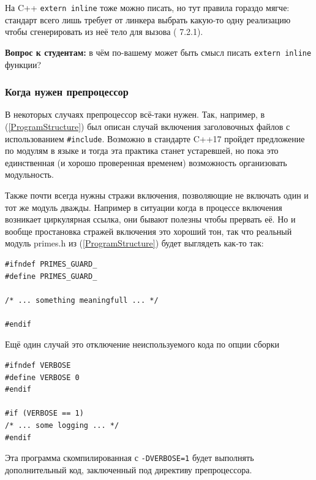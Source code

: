 \documentclass[a4paper,12pt,oneside]{article}
\newif\ifanswers
\begin{document}
На C++ \lstinline!extern inline! тоже можно писать, но тут правила гораздо мягче: стандарт всего лишь требует от линкера выбрать какую-то одну реализацию чтобы сгенерировать из неё тело для вызова (\cite{stdcpp14} 7.2.1).

\textbf{Вопрос к студентам:} в чём по-вашему может быть смысл писать \lstinline!extern inline! функции?

\ifanswers
Возможный ответ: семантика статических переменных -- внутри \lstinline!static inline! функций создается столько их копий сколько функций, внутри \lstinline!extern inline! копия одна на всех.
\fi

\subsubsection{Когда нужен препроцессор}

В некоторых случаях препроцессор всё-таки нужен. Так, например, в (\ref{ProgramStructure}) был описан случай включения заголовочных файлов с использованием \lstinline!#include!. Возможно в стандарте C++17 пройдет предложение по модулям в языке и тогда эта практика станет устаревшей, но пока это единственная (и хорошо проверенная временем) возможность организовать модульность.

Также почти всегда нужны стражи включения, позволяющие не включать один и тот же модуль дважды. Например в ситуации когда в процессе включения возникает циркулярная ссылка, они бывают полезны чтобы прервать её. Но и вообще простановка стражей включения это хороший тон, так что реальный модуль primes.h из (\ref{ProgramStructure}) будет выглядеть как-то так:

\begin{lstlisting}
#ifndef PRIMES_GUARD_
#define PRIMES_GUARD_

/* ... something meaningfull ... */

#endif
\end{lstlisting}

Ещё один случай это отключение неиспользуемого кода по опции сборки

\begin{lstlisting}
#ifndef VERBOSE
#define VERBOSE 0
#endif

#if (VERBOSE == 1)
/* ... some logging ... */
#endif
\end{lstlisting}

Эта программа скомпилированная с \lstinline!-DVERBOSE=1! будет выполнять дополнительный код, заключенный под директиву препроцессора.
\end{document}
